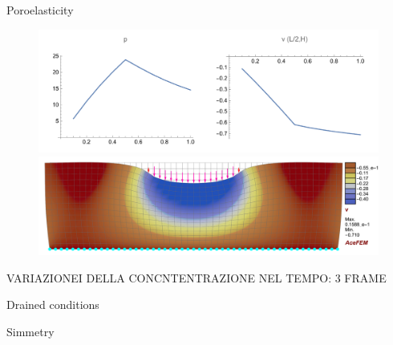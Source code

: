 \documentclass[aspectratio=169,xcolor=dvipsnames]{beamer}
\begin{document}
\begin{frame}{Poroelasticity}
	\begin{figure}
	\begin{minipage}{\linewidth}
		\begin{minipage}{0.6\linewidth}\centering
			\includegraphics[width=\linewidth]{undrained.pdf}
		\end{minipage}\hfill
		\begin{minipage}{0.3\linewidth}\centering
			\includegraphics[width=\linewidth]{undrained_v.pdf}
		\end{minipage}\hfill
	\end{minipage}
\end{figure}
VARIAZIONEI DELLA CONCNTENTRAZIONE NEL TEMPO: 3 FRAME

\end{frame}

\begin{frame}{Drained conditions}

\end{frame}


\begin{frame}{Simmetry}
	
\end{frame}
\end{document}
